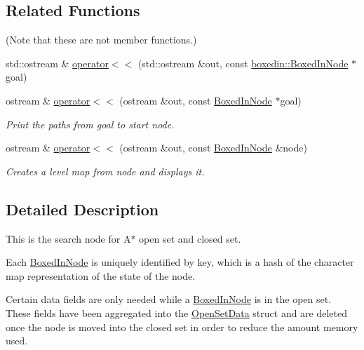\subsection*{Related Functions}
(Note that these are not member functions.) \begin{DoxyCompactItemize}
\item 
std\+::ostream \& \hyperlink{classboxedin_1_1BoxedInNode_a274bba98e78e14edbeb5457c8d836aaf}{operator$<$$<$} (std\+::ostream \&out, const \hyperlink{classboxedin_1_1BoxedInNode}{boxedin\+::\+Boxed\+In\+Node} $\ast$goal)
\item 
ostream \& \hyperlink{classboxedin_1_1BoxedInNode_a65d7cc3f5f20a84f081d6618fefbbccc}{operator$<$$<$} (ostream \&out, const \hyperlink{classboxedin_1_1BoxedInNode}{Boxed\+In\+Node} $\ast$goal)
\begin{DoxyCompactList}\small\item\em Print the paths from goal to start node. \end{DoxyCompactList}\item 
ostream \& \hyperlink{classboxedin_1_1BoxedInNode_a2bb8d27936b1738095a48345758b7e84}{operator$<$$<$} (ostream \&out, const \hyperlink{classboxedin_1_1BoxedInNode}{Boxed\+In\+Node} \&node)
\begin{DoxyCompactList}\small\item\em Creates a level map from node and displays it. \end{DoxyCompactList}\end{DoxyCompactItemize}


\subsection{Detailed Description}
This is the search node for A$\ast$ open set and closed set. 

Each \hyperlink{classboxedin_1_1BoxedInNode}{Boxed\+In\+Node} is uniquely identified by key, which is a hash of the character map representation of the state of the node.

Certain data fields are only needed while a \hyperlink{classboxedin_1_1BoxedInNode}{Boxed\+In\+Node} is in the open set. These fields have been aggregated into the \hyperlink{classboxedin_1_1OpenSetData}{Open\+Set\+Data} struct and are deleted once the node is moved into the closed set in order to reduce the amount memory used. 

